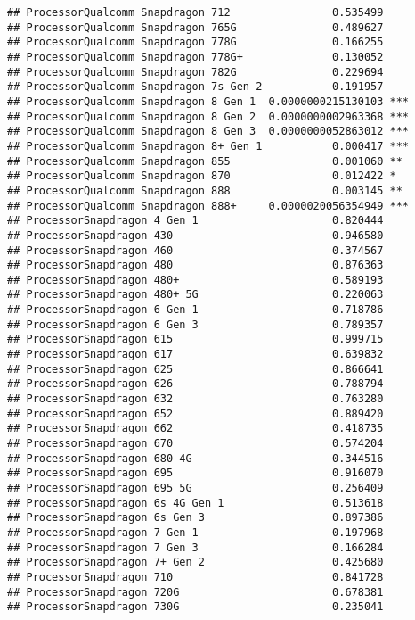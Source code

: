 \documentclass[
]{article}
\begin{document}
\begin{verbatim}
## ProcessorQualcomm Snapdragon 712                0.535499    
## ProcessorQualcomm Snapdragon 765G               0.489627    
## ProcessorQualcomm Snapdragon 778G               0.166255    
## ProcessorQualcomm Snapdragon 778G+              0.130052    
## ProcessorQualcomm Snapdragon 782G               0.229694    
## ProcessorQualcomm Snapdragon 7s Gen 2           0.191957    
## ProcessorQualcomm Snapdragon 8 Gen 1  0.0000000215130103 ***
## ProcessorQualcomm Snapdragon 8 Gen 2  0.0000000002963368 ***
## ProcessorQualcomm Snapdragon 8 Gen 3  0.0000000052863012 ***
## ProcessorQualcomm Snapdragon 8+ Gen 1           0.000417 ***
## ProcessorQualcomm Snapdragon 855                0.001060 ** 
## ProcessorQualcomm Snapdragon 870                0.012422 *  
## ProcessorQualcomm Snapdragon 888                0.003145 ** 
## ProcessorQualcomm Snapdragon 888+     0.0000020056354949 ***
## ProcessorSnapdragon 4 Gen 1                     0.820444    
## ProcessorSnapdragon 430                         0.946580    
## ProcessorSnapdragon 460                         0.374567    
## ProcessorSnapdragon 480                         0.876363    
## ProcessorSnapdragon 480+                        0.589193    
## ProcessorSnapdragon 480+ 5G                     0.220063    
## ProcessorSnapdragon 6 Gen 1                     0.718786    
## ProcessorSnapdragon 6 Gen 3                     0.789357    
## ProcessorSnapdragon 615                         0.999715    
## ProcessorSnapdragon 617                         0.639832    
## ProcessorSnapdragon 625                         0.866641    
## ProcessorSnapdragon 626                         0.788794    
## ProcessorSnapdragon 632                         0.763280    
## ProcessorSnapdragon 652                         0.889420    
## ProcessorSnapdragon 662                         0.418735    
## ProcessorSnapdragon 670                         0.574204    
## ProcessorSnapdragon 680 4G                      0.344516    
## ProcessorSnapdragon 695                         0.916070    
## ProcessorSnapdragon 695 5G                      0.256409    
## ProcessorSnapdragon 6s 4G Gen 1                 0.513618    
## ProcessorSnapdragon 6s Gen 3                    0.897386    
## ProcessorSnapdragon 7 Gen 1                     0.197968    
## ProcessorSnapdragon 7 Gen 3                     0.166284    
## ProcessorSnapdragon 7+ Gen 2                    0.425680    
## ProcessorSnapdragon 710                         0.841728    
## ProcessorSnapdragon 720G                        0.678381    
## ProcessorSnapdragon 730G                        0.235041    

\end{verbatim}
\end{document}
